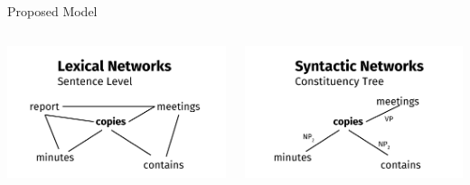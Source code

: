\documentclass[10pt,xcolor=table]{beamer}
\begin{document}
\begin{frame}{Proposed Model}
	\begin{columns}
		\begin{minipage}[c][0.4\textheight][c]{\linewidth}
			 \centering
			 \includegraphics[width=1\linewidth]{image2/Chapitre2/lexi_network_ex.pdf}
		\end{minipage}
		\begin{minipage}[c][0.4\textheight][c]{\linewidth}
			 \centering
			 \includegraphics[width=1\linewidth]{image2/Chapitre2/consti_network_ex.pdf}
		\end{minipage}		
		\begin{minipage}[c][0.4\textheight][c]{\linewidth}

\end{minipage}
\end{columns}
\end{frame}
\end{document}
